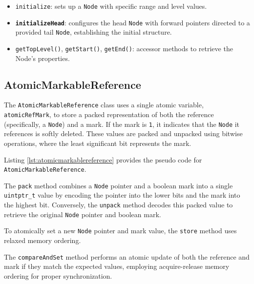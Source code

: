 \begin{itemize}
    \item \texttt{initialize}: sets up a \texttt{Node} with specific range and level values.
    \item \textbf{\texttt{initializeHead}}: configures the head \texttt{Node} with forward pointers directed to a provided tail \texttt{Node}, establishing the initial structure.
    \item \texttt{getTopLevel()}, \texttt{getStart()}, \texttt{getEnd()}: accessor methods to retrieve the Node's properties.
\end{itemize}

\begin{figure}[h]
    \centering
    
\end{figure}

\clearpage

\subsection{AtomicMarkableReference} \label{subsec:atomicmarkablereference}

The \texttt{AtomicMarkableReference} class uses a single atomic variable, \texttt{atomicRefMark}, to store a packed representation of both the reference (specifically, a \texttt{Node}) and a mark. If the mark is \texttt{1}, it indicates that the \texttt{Node} it references is softly deleted. These values are packed and unpacked using bitwise operations, where the least significant bit represents the mark.

Listing \ref{lst:atomicmarkablereference} provides the pseudo code for \texttt{AtomicMarkableReference}.

The \texttt{pack} method combines a \texttt{Node} pointer and a boolean mark into a single \texttt{uintptr\_t} value by encoding the pointer into the lower bits and the mark into the highest bit. Conversely, the \texttt{unpack} method decodes this packed value to retrieve the original \texttt{Node} pointer and boolean mark.

To atomically set a new \texttt{Node} pointer and mark value, the \texttt{store} method uses relaxed memory ordering.

The \texttt{compareAndSet} method performs an atomic update of both the reference and mark if they match the expected values, employing acquire-release memory ordering for proper synchronization.

